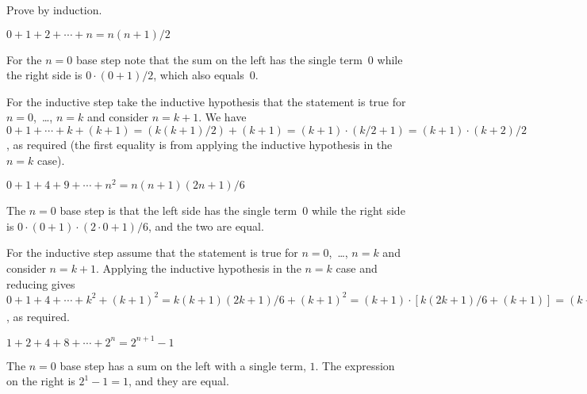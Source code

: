 \documentclass{ibl}  %
\begin{document}
\begin{problem}
Prove by induction.
\begin{exes}
\begin{exercise}
  $0+1+2+\cdots+n=n(n+1)/2$
\end{exercise}
\begin{answer}
  For the $n=0$ base step note that the sum on the left
  has the single term~$0$
  while the right side is $0\cdot(0+1)/2$, which also equals~$0$.

  For the inductive step take the inductive hypothesis 
  that the statement is true for $n=0$,~\ldots, $n=k$ and consider $n=k+1$.
  We have 
  $0+1+\cdots+k+(k+1)=(k(k+1)/2)+(k+1)=(k+1)\cdot(k/2+1)=(k+1)\cdot(k+2)/2$, 
  as required  
  (the first equality is from applying the inductive hypothesis in 
  the $n=k$ case).
\end{answer} 
\begin{exercise}
  $0+1+4+9+\cdots+n^2=n(n+1)(2n+1)/6$
\end{exercise}
\begin{answer} 
  The $n=0$ base step is that the left side has the single term~$0$
  while the right side is $0\cdot(0+1)\cdot(2\cdot 0+1)/6$, and the 
  two are equal.

  For the inductive step assume that the statement is true for 
  $n=0$,~\ldots, $n=k$ and consider $n=k+1$.
  Applying the inductive hypothesis in the $n=k$ case and reducing gives
  $0+1+4+\cdots+k^2+(k+1)^2=k(k+1)(2k+1)/6+(k+1)^2
    =(k+1)\cdot [k(2k+1)/6+(k+1)]
    =(k+1)\cdot [k(2k+1)+6(k+1)]/6
    =(k+1)\cdot [2k^2+7k+6]/6
    =(k+1)(k+2)(2(k+1)+1)/6$,
  as required.
\end{answer}

\begin{exercise}
  $1+2+4+8+\cdots+2^n=2^{n+1}-1$
\end{exercise}
\begin{answer} 
The $n=0$ base step has a sum on the left with a single term, $1$.
The expression on the right is $2^1-1=1$, and they are equal.


\end{answer}
\end{exes}
\end{problem}
\end{document}
